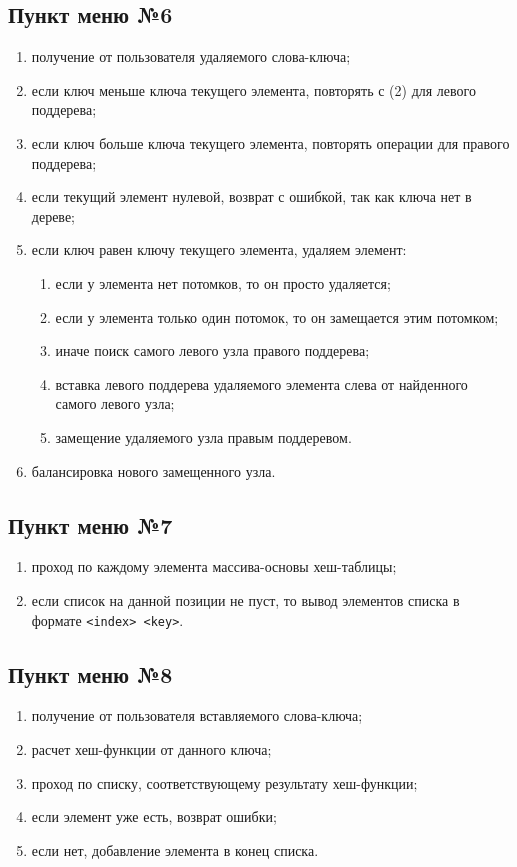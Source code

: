 \documentclass[a4paper,12pt]{extarticle}
\begin{document}
\subsection{Пункт меню №6}
\begin{enumerate}
    \item получение от пользователя удаляемого слова-ключа;
    \item если ключ меньше ключа текущего элемента, повторять с (2) для левого поддерева;
   	\item если ключ больше ключа текущего элемента, повторять операции для правого поддерева;
   	\item если текущий элемент нулевой, возврат с ошибкой, так как ключа нет в дереве;
   	\item если ключ равен ключу текущего элемента, удаляем элемент:
   	\begin{enumerate}
   		\item если у элемента нет потомков, то он просто удаляется;
   		\item если у элемента только один потомок, то он замещается этим потомком;
   		\item иначе поиск самого левого узла правого поддерева;
   		\item вставка левого поддерева удаляемого элемента слева от найденного самого левого узла;
   		\item замещение удаляемого узла правым поддеревом.
   	\end{enumerate}
   	\item балансировка нового замещенного узла.
\end{enumerate}

\subsection{Пункт меню №7}
\begin{enumerate}
    \item проход по каждому элемента массива-основы хеш-таблицы;
    \item если список на данной позиции не пуст, то вывод элементов списка в формате \texttt{<index> <key>}.
\end{enumerate}

\subsection{Пункт меню №8}
\begin{enumerate}
    \item получение от пользователя вставляемого слова-ключа;
    \item расчет хеш-функции от данного ключа;
    \item проход по списку, соответствующему результату хеш-функции;
    \item если элемент уже есть, возврат ошибки;
    \item если нет, добавление элемента в конец списка.
\end{enumerate}
\end{document}
